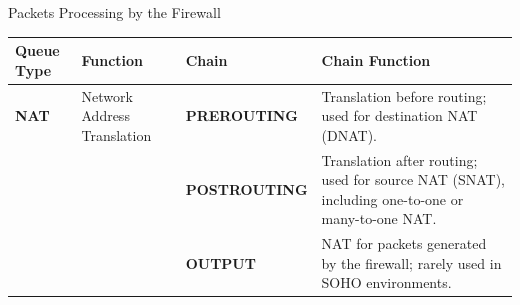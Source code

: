 \begin{frame}{Packets Processing by the Firewall}
\centering\fontsize{11.5}{13.5}\selectfont
\renewcommand{\arraystretch}{1.35}
\begin{tabular}{|Y{1.5cm}|Y{2.0cm}|Y{2.5cm}|Y{6.4cm}|}\hline
{}\color{white}\bfseries Queue Type&\color{white}\bfseries Function&\color{white}\bfseries Chain&\color{white}\bfseries Chain Function\\\hline
\textcolor{CommandGreen}{\bfseries NAT}&Network Address Translation&\textcolor{WarningColor}{\bfseries PREROUTING}&Translation before routing; used for destination NAT (DNAT).\\
&&\textcolor{WarningColor}{\bfseries POSTROUTING}&Translation after routing; used for source NAT (SNAT), including one-to-one or many-to-one NAT.\\
&&\textcolor{WarningColor}{\bfseries OUTPUT}&NAT for packets generated by the firewall; rarely used in SOHO environments.\\\hline
\end{tabular}
\end{frame}
